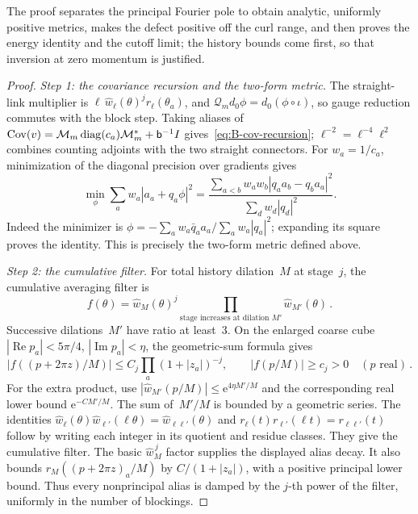 The proof separates the principal Fourier pole to obtain analytic, uniformly positive metrics, makes the defect positive off the curl range, and then proves the energy identity and the cutoff limit; the history bounds come first, so that inversion at zero momentum is justified.
\begin{proof}
\emph{Step 1: the covariance recursion and the two-form metric.} The straight-link multiplier is $\ell\,\widehat w_\ell(\theta)^jr_\ell(\theta_a)$, and $\mathcal Q_md_0\phi=d_0(\phi\circ\iota)$, so gauge reduction commutes with the block step. Taking aliases of $\operatorname{Cov}(v)=\mathcal M_m\operatorname{diag}(c_a)\mathcal M_m^*+\mathsf{b}^{-1}I$ gives~\eqref{eq:B-cov-recursion}; $\ell^{-2}=\ell^{-4}\ell^2$ combines counting adjoints with the two straight connectors. For $w_a=1/c_a$, minimization of the diagonal precision over gradients gives
\begin{equation*}
\min_\phi\sum_aw_a|a_a+q_a\phi|^2
=\frac{\sum_{a<b}w_aw_b|q_aa_b-q_ba_a|^2}{\sum_dw_d|q_d|^2}.
\end{equation*}
Indeed the minimizer is $\phi=-\sum_aw_a\bar q_aa_a/\sum_aw_a|q_a|^2$; expanding its square proves the identity. This is precisely the two-form metric defined above.

\emph{Step 2: the cumulative filter.} For total history dilation~$M$ at stage~$j$, the cumulative averaging filter is
\begin{equation*}
f(\theta)=\widehat w_M(\theta)^j\prod_{\text{stage increases at dilation }M'}\widehat w_{M'}(\theta)\,.
\end{equation*}
Successive dilations~$M'$ have ratio at least~$3$. On the enlarged coarse cube $|\operatorname{Re}p_a|<5\pi/4$, $|\operatorname{Im}p_a|<\eta$, the geometric-sum formula gives
\begin{equation}\label{eq:B-filter}
|f((p+2\pi z)/M)|\le C_j\prod_a(1+|z_a|)^{-j},\qquad
|f(p/M)|\ge c_j>0\quad(p\text{ real})\,.
\end{equation}
For the extra product, use $|\widehat w_{M'}(p/M)|\le \mathrm e^{4\eta M'/M}$ and the corresponding real lower bound $\mathrm e^{-C M'/M}$. The sum of~$M'/M$ is bounded by a geometric series. The identities $\widehat w_\ell(\theta)\widehat w_{\ell'}(\ell\theta)=\widehat w_{\ell\ell'}(\theta)$ and $r_\ell(t)r_{\ell'}(\ell t)=r_{\ell\ell'}(t)$ follow by writing each integer in its quotient and residue classes. They give the cumulative filter. The basic $\widehat w_M^{\,j}$ factor supplies the displayed alias decay. It also bounds $r_M((p+2\pi z)_a/M)$ by $C/(1+|z_a|)$, with a positive principal lower bound. Thus every nonprincipal alias is damped by the $j$-th power of the filter, uniformly in the number of blockings.


\end{proof}

